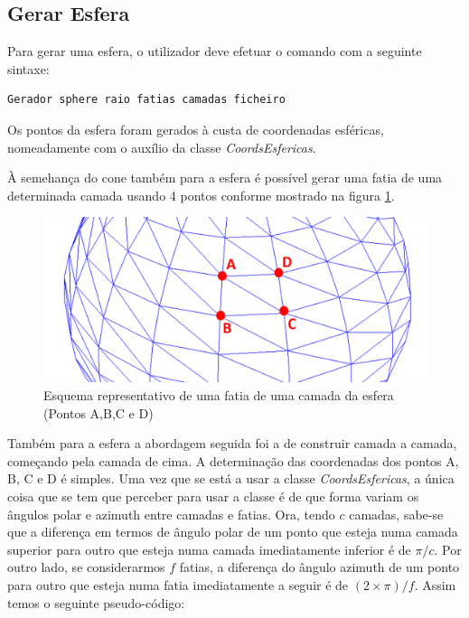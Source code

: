 \newpage
\subsection{Gerar Esfera}

Para gerar uma esfera, o utilizador deve efetuar o comando com a seguinte sintaxe:

\begin{Verbatim}
Gerador sphere raio fatias camadas ficheiro
\end{Verbatim}

Os pontos da esfera foram gerados à custa de coordenadas esféricas, nomeadamente com o auxílio da classe \textit{CoordsEsfericas}.

À semehança do cone também para a esfera é possível gerar uma fatia de uma determinada camada usando 4 pontos conforme mostrado na figura \ref{p1:fig:p3_esferaSeccao_edit}.

\begin{figure}[<+htpb+>]
	\centering
	\includegraphics[scale=0.5]{imagens/p3_esferaSeccao_edit.png}
	\caption{Esquema representativo de uma fatia de uma camada da esfera (Pontos A,B,C e D)}
	\label{p1:fig:p3_esferaSeccao_edit}
\end{figure}

Também para a esfera a abordagem seguida foi a de construir camada a camada, começando pela camada de cima. A determinação das coordenadas dos pontos A, B, C e D é simples. Uma vez que se está a usar a classe \textit{CoordsEsfericas}, a única coisa que se tem que perceber para usar a classe é de que forma variam os ângulos polar e azimuth entre camadas e fatias. Ora, tendo $c$ camadas, sabe-se que a diferença em termos de ângulo polar de um ponto que esteja numa camada superior para outro que esteja numa camada imediatamente inferior é de $\pi / c$. Por outro lado, se considerarmos $f$ fatias, a diferença do ângulo azimuth de um ponto para outro que esteja numa fatia imediatamente a seguir é de $(2 \times \pi) / f$. Assim temos o seguinte pseudo-código:

